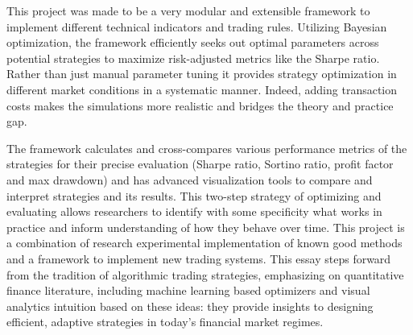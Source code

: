 This project was made to be a very modular and extensible framework to implement different technical indicators and trading rules. Utilizing Bayesian optimization, the framework efficiently seeks out optimal parameters across potential strategies to maximize risk-adjusted metrics like the Sharpe ratio. Rather than just manual parameter tuning it provides strategy optimization in different market conditions in a systematic manner. Indeed, adding transaction costs makes the simulations more realistic and bridges the theory and practice gap.

The framework calculates and cross-compares various performance metrics of the strategies for their precise evaluation (Sharpe ratio, Sortino ratio, profit factor and max drawdown) and has advanced visualization tools to compare and interpret strategies and its results. This two-step strategy of optimizing and evaluating allows researchers to identify with some specificity what works in practice and inform understanding of how they behave over time. This project is a combination of research experimental implementation of known good methods and a framework to implement new trading systems. This essay steps forward from the tradition of algorithmic trading strategies, emphasizing on quantitative finance literature, including machine learning based optimizers and visual analytics intuition based on these ideas: they provide insights to designing efficient, adaptive strategies in today’s financial market regimes.

